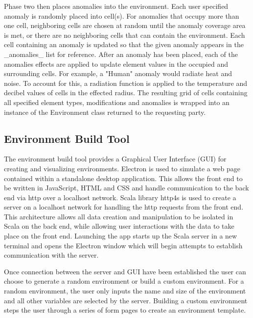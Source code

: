 Phase two then places anomalies into the environment.
Each user specified anomaly is randomly placed into cell(s).
For anomalies that occupy more than one cell, neighboring cells are chosen at random until the anomaly coverage area is met, or there are no neighboring cells that can contain the environment.
Each cell containing an anomaly is updated so that the given anomaly appears in the _anomalies_ list for reference.
After an anomaly has been placed, each of the anomalies effects are applied to update element values in the occupied and surrounding cells.
For example, a "Human" anomaly would radiate heat and noise.
To account for this, a radiation function  is applied to the temperature and decibel values of cells in the effected radius.
The resulting grid of cells containing all specified element types, modifications and anomalies is wrapped into an instance of the Environment class returned to the requesting party.

\subsection{Environment Build Tool}
The environment build tool provides a Graphical User Interface (GUI) for creating and visualizing environments.
Electron  is used to simulate a web page contained within a standalone desktop application.
This allows the front end to be written in JavaScript, HTML and CSS and handle communication to the back end via http over a localhost network.
Scala library http4s  is used to create a server on a localhost network for handling the http requests from the front end.
This architecture allows all data creation and manipulation to be isolated in Scala on the back end, while allowing user interactions with the data to take place on the front end.
Launching the app starts up the Scala server in a new terminal and opens the Electron window which will begin attempts to establish communication with the server.

Once connection between the server and GUI have been established the user can choose to generate a random environment or build a custom environment. 
For a random environment, the user only inputs the name and size of the environment and all other variables are selected by the server.
Building a custom environment steps the user through a series of form pages to create an environment template.

